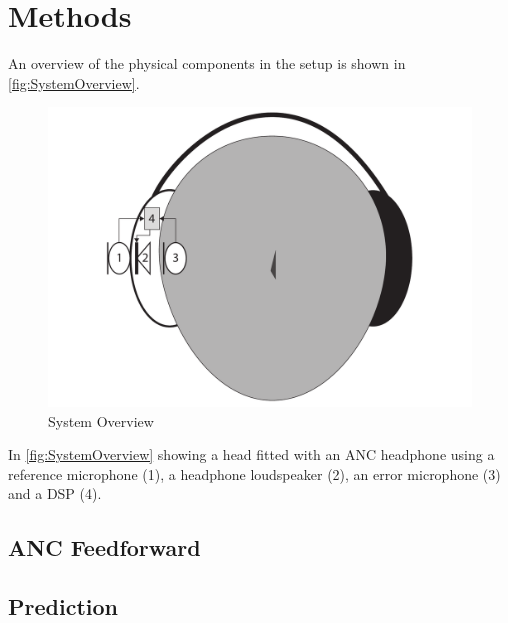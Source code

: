 

\section{Methods}
An overview of the physical components in the setup is shown in \autoref{fig:SystemOverview}.
\begin{figure}[H]
	\centering
	\includegraphics[width=1\columnwidth]{figures/ArticleIllustrations/SystemOverview}
	\caption{System Overview}
	\label{fig:SystemOverview}
\end{figure}
In \autoref{fig:SystemOverview} showing a head fitted with an ANC headphone using a reference microphone (1), a headphone loudspeaker (2), an error microphone (3) and a DSP (4).  

\subsection*{ANC Feedforward}
\subsection*{Prediction}